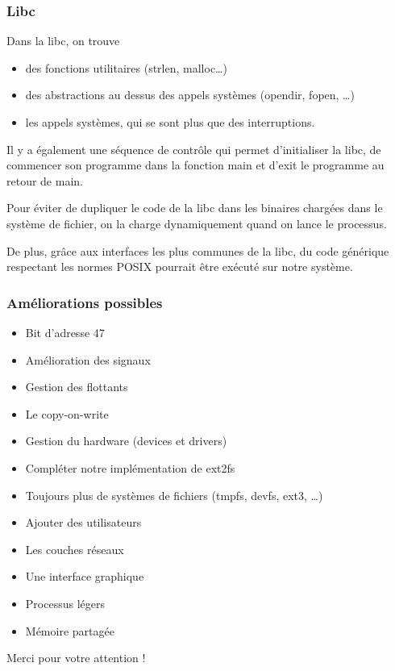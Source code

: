 \documentclass[10pt,a4paper]{beamer}
\begin{document}
\begin{frame}
  \frametitle{Libc}
  Dans la libc, on trouve
  \begin{itemize}
  \item des fonctions utilitaires (\textrm{strlen}, \textrm{malloc}\ldots)
  \item des abstractions au dessus des appels systèmes (\textrm{opendir}, \textrm{fopen}, \ldots)
  \item les appels systèmes, qui se sont plus que des interruptions.
  \end{itemize}

  Il y a également une séquence de contrôle qui permet d'initialiser la libc, de commencer son programme dans la fonction \textrm{main} et d'\textrm{exit} le programme au retour  de \textrm{main}.

  Pour éviter de dupliquer le code de la libc dans les binaires chargées dans le système de fichier, on la charge dynamiquement quand on lance le processus.

  De plus, grâce aux interfaces les plus communes de la libc, du code générique respectant les normes \textrm{POSIX} pourrait être exécuté sur notre système.

\end{frame}

\begin{frame}
  \frametitle{Améliorations possibles}
  \begin{itemize}
  \item Bit d'adresse 47
  \item Amélioration des signaux
  \item Gestion des flottants
  \item Le copy-on-write
  \item Gestion du hardware (devices et drivers)
  \item Compléter notre implémentation de ext2fs
  \item Toujours plus de systèmes de fichiers (tmpfs, devfs, ext3, \ldots)
  \item Ajouter des utilisateurs
  \item Les couches réseaux
  \item Une interface graphique
  \item Processus légers
  \item Mémoire partagée
  \end{itemize}

  \thinspace{}
  \begin{center}
    \large{Merci pour votre attention !}
  \end{center}

\end{frame}
\end{document}
